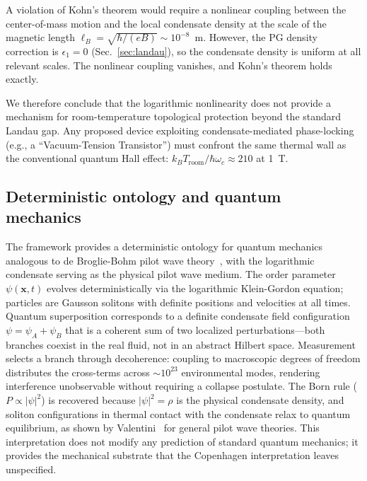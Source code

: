 \documentclass[12pt, a4paper]{article}
\begin{document}
A violation of Kohn's theorem would require a
nonlinear coupling between the center-of-mass
motion and the local condensate density at the
scale of the magnetic length
$\ell_B = \sqrt{\hbar/(eB)} \sim 10^{-8}$~m.
However, the PG density correction is
$\epsilon_1 = 0$ (Sec.~\ref{sec:landau}), so the
condensate density is uniform at all relevant
scales. The nonlinear coupling vanishes, and
Kohn's theorem holds exactly.

We therefore conclude that the logarithmic
nonlinearity does not provide a mechanism for
room-temperature topological protection beyond
the standard Landau gap. Any proposed device
exploiting condensate-mediated phase-locking
(e.g., a ``Vacuum-Tension Transistor'') must
confront the same thermal wall as the conventional
quantum Hall effect:
$k_B T_{\mathrm{room}}/\hbar\omega_c \approx 210$
at 1~T.

\subsection{Deterministic ontology and quantum mechanics}

The framework provides a deterministic ontology for
quantum mechanics analogous to de Broglie-Bohm pilot
wave theory~\cite{bohm_1952}, with the logarithmic
condensate serving as the physical pilot wave medium.
The order parameter $\psi(\mathbf{x},t)$ evolves
deterministically via the logarithmic Klein-Gordon
equation; particles are Gausson solitons with
definite positions and velocities at all times. Quantum
superposition corresponds to a definite condensate
field configuration $\psi = \psi_A + \psi_B$ that is
a coherent sum of two localized perturbations---both
branches coexist in the real fluid, not in an abstract
Hilbert space. Measurement selects a branch through
decoherence: coupling to macroscopic degrees of
freedom distributes the cross-terms across
$\sim 10^{23}$ environmental modes, rendering
interference unobservable without requiring a
collapse postulate. The Born rule
($P \propto |\psi|^2$) is recovered because
$|\psi|^2 = \rho$ is the physical condensate density,
and soliton configurations in thermal contact with
the condensate relax to quantum equilibrium, as shown
by Valentini~\cite{valentini_1991} for general
pilot wave theories. This interpretation does not
modify any prediction of standard quantum mechanics;
it provides the mechanical substrate that the
Copenhagen interpretation leaves unspecified.

\end{document}
